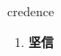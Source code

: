 
\begin{frame}
{\huge credence}
\begin{center}
\begin{enumerate}\Large
  \item \textbf{坚信}
\end{enumerate}
\end{center}
\end{frame}
